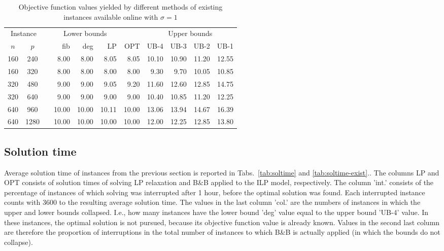 \begin{table}[]
\centering
\begin{tabular}{ccrrrrrrrrr}
\multicolumn{2}{c}{Instance} & &\multicolumn{3}{c}{Lower bounds}  & &\multicolumn{4}{c}{Upper bounds} \\
\cline{1-2}\cline{4-6}\cline{8-11}
$n$ & $p$  &   & fib  & deg  & LP   & OPT & UB-4  & UB-3  & UB-2  & UB-1  \\
\hline
 160 & 240  && 8.00 & 8.00 & 8.05 & 8.05 &10.10 &10.90  &11.20  & 12.55 \\
 160 & 320  && 8.00 & 8.00 & 8.00 & 8.00 & 9.30 & 9.70  &10.05  & 10.85 \\
 320 & 480  && 9.00 & 9.00 & 9.05 & 9.20 &11.60 &12.60  &12.85  & 14.75 \\
 320 & 640  && 9.00 & 9.00 & 9.00 & 9.00 &10.40 &10.85  &11.20  & 12.25 \\
 640 & 960  &&10.00 &10.00 &10.11 &10.00 &13.06 &13.94  &14.67  & 16.39 \\
 640 &1280  &&10.00 &10.00 &10.00 &10.00 &12.00 &12.25  &12.85  & 13.80 \\
\end{tabular}
\caption{Objective function values yielded by different methods of existing instances available online with $\sigma=1$}
\label{tab:obj-exist}
\end{table}
\subsection{Solution time}

Average solution time of instances from the previous section is reported in Tabs.~\ref{tab:soltime} and \ref{tab:soltime-exist}..
The columns LP and OPT consists of solution times of solving LP relaxation and B\&B applied to the ILP model, respectively.
The column 'int.' consists of the percentage of instances of which solving was interrupted after 1 hour, before the optimal solution was found.
Each interrupted instance counts with 3600 to the resulting average solution time.
The values in the last column 'col.' are the numbers of instances in which the upper and lower bounds collapsed. 
I.e., how many instances have the lower bound 'deg' value equal to the upper bound 'UB-4' value.
In these instances, the optimal solution is not pursued, because its objective function value is already known.
Values in the second last column are therefore the proportion of interruptions in the total number of instances to which B\&B is actually applied 
(in which the bounds do not collapse).

